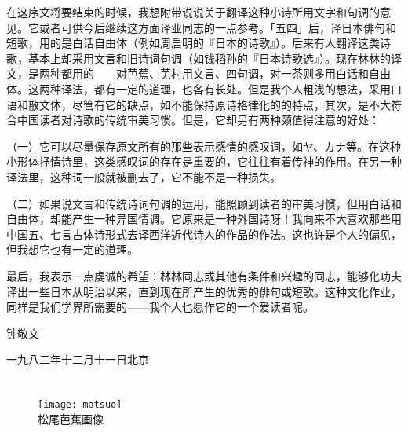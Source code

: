 {    在这序文将要结束的时候，我想附带说说关于翻译这种小诗所用文字和句调的意见。它或者可供今后继续这方面译业同志的一点参考。「五四」后，译日本俳句和短歌，用的是白话自由体（例如周启明的『日本的诗歌』）。后来有人翻译这类诗歌，基本上却采用文言和旧诗词句调（如钱稻孙的『日本诗歌选』）。现在林林的译文，是两种都用的——对芭蕉、芜村用文言、四句调，对一茶则多用白话和自由体。这两种译法，都有一定的道理，也各有长处。但是我个人粗浅的想法，采用口语和散文体，尽管有它的缺点，如不能保持原诗格律化的的特点，其次，是不大符合中国读者对诗歌的传统审美习惯。但是，它却另有两种颇值得注意的好处：

    （一）它可以尽量保存原文所有的那些表示感情的感叹词，如ヤ、カナ等。在这种小形体抒情诗里，这类感叹词的存在是重要的，它往往有着传神的作用。在另一种译法里，这种词一般就被删去了，它不能不是一种损失。

    （二）如果说文言和传统诗词句调的运用，能照顾到读者的审美习惯，但用白话和自由体，却能产生一种异国情调。它原来是一种外国诗呀！我向来不大喜欢那些用中国五、七言古体诗形式去译西洋近代诗人的作品的作法。这也许是个人的偏见，但我想它也有一定的道理。

    最后，我表示一点虔诚的希望：林林同志或其他有条件和兴趣的同志，能够化功夫译出一些日本从明治以来，直到现在所产生的优秀的俳句或短歌。这种文化作业，同样是我们学界所需要的——我个人也愿作它的一个爱读者呢。

    \hfill 钟敬文

    \hfill 一九八二年十二月十一日北京
}

\chapter[{\FM 松尾芭蕉}]{\FM {}}

\begin{center}
    \begin{figure}
        \centering
        \texttt{[image: matsuo]}\\[1em]
        \large{\FS 松尾芭蕉画像}
    \end{figure}
\end{center}

\newpage

